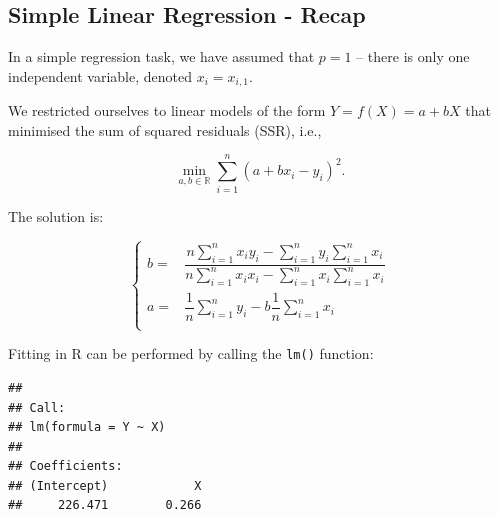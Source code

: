 \documentclass[10pt,b5paper,krantz1]{krantz}
\newenvironment{Shaded}{\begin{snugshade}}{\end{snugshade}}
\newcommand{\CommentTok}[1]{\textcolor[rgb]{0.37,0.37,0.37}{\textit{#1}}}
\newcommand{\DecValTok}[1]{\textcolor[rgb]{0.06,0.06,0.06}{#1}}
\newcommand{\KeywordTok}[1]{\textcolor[rgb]{0.27,0.27,0.27}{\textbf{#1}}}
\newcommand{\NormalTok}[1]{#1}
\newcommand{\OperatorTok}[1]{\textcolor[rgb]{0.43,0.43,0.43}{\textbf{#1}}}
\newcommand{\StringTok}[1]{\textcolor[rgb]{0.5,0.5,0.5}{#1}}
\begin{document}
\hypertarget{simple-linear-regression---recap}{%
\subsection{Simple Linear Regression - Recap}\label{simple-linear-regression---recap}}

In a simple regression task, we have assumed that \(p=1\) -- there is only
one independent variable,
denoted \(x_i=x_{i,1}\).

We restricted ourselves to linear models of the form \(Y=f(X)=a+bX\)
that minimised the sum of squared residuals (SSR), i.e.,

\[
\min_{a,b\in\mathbb{R}} \sum_{i=1}^n \left(
a+bx_i-y_i
\right)^2.
\]

The solution is:

\[
\left\{
\begin{array}{rl}
b  = & \dfrac{
n \displaystyle\sum_{i=1}^n x_i y_i - \displaystyle\sum_{i=1}^n  y_i \displaystyle\sum_{i=1}^n x_i
}{
n \displaystyle\sum_{i=1}^n x_i x_i -   \displaystyle\sum_{i=1}^n x_i\displaystyle\sum_{i=1}^n x_i
}\\
a = & \dfrac{1}{n}\displaystyle\sum_{i=1}^n  y_i - b  \dfrac{1}{n} \displaystyle\sum_{i=1}^n x_i  \\
\end{array}
\right.
\]

Fitting in R can be performed by calling the \texttt{lm()} function:

\begin{Shaded}
\end{Shaded}

\begin{verbatim}
## 
## Call:
## lm(formula = Y ~ X)
## 
## Coefficients:
## (Intercept)            X  
##     226.471        0.266
\end{verbatim}
\end{document}
